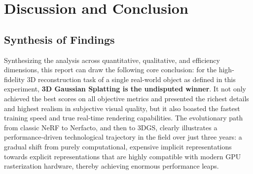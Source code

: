 \documentclass[11pt]{article}
\begin{document}
\section{Discussion and Conclusion}

\subsection{Synthesis of Findings}
Synthesizing the analysis across quantitative, qualitative, and efficiency dimensions, this report can draw the following core conclusion: for the high-fidelity 3D reconstruction task of a single real-world object as defined in this experiment, \textbf{3D Gaussian Splatting is the undisputed winner}. It not only achieved the best scores on all objective metrics and presented the richest details and highest realism in subjective visual quality, but it also boasted the fastest training speed and true real-time rendering capabilities.
The evolutionary path from classic NeRF to Nerfacto, and then to 3DGS, clearly illustrates a performance-driven technological trajectory in the field over just three years: a gradual shift from purely computational, expensive implicit representations towards explicit representations that are highly compatible with modern GPU rasterization hardware, thereby achieving enormous performance leaps.
\end{document}
